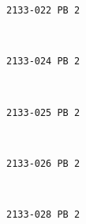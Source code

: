 \documentclass[11pt]{article}
\begin{document}
    \begin{Verbatim}[commandchars=\\\{\}]
2133-022 PB 2

    \end{Verbatim}

    \begin{center}
    \end{center}
    { \hspace*{\fill} \\}
    
    \begin{Verbatim}[commandchars=\\\{\}]
2133-024 PB 2

    \end{Verbatim}

    \begin{center}
    \end{center}
    { \hspace*{\fill} \\}
    
    \begin{Verbatim}[commandchars=\\\{\}]
2133-025 PB 2

    \end{Verbatim}

    \begin{center}
    \end{center}
    { \hspace*{\fill} \\}
    
    \begin{Verbatim}[commandchars=\\\{\}]
2133-026 PB 2

    \end{Verbatim}

    \begin{center}
    \end{center}
    { \hspace*{\fill} \\}
    
    \begin{Verbatim}[commandchars=\\\{\}]
2133-028 PB 2

    \end{Verbatim}
\end{document}
